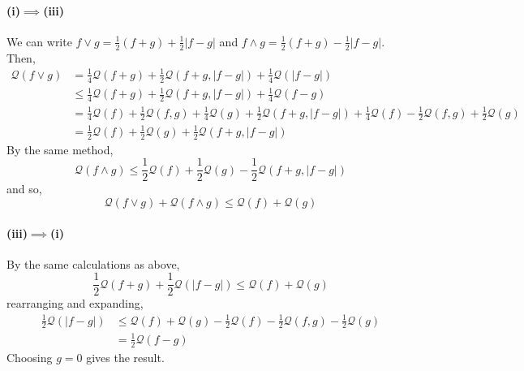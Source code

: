 \paragraph{(i)$\implies$(iii)}
We can write $f\vee g = \frac{1}{2}(f+g)+\frac{1}{2}|f-g|$ and $f\wedge g = \frac{1}{2}(f+g)-\frac{1}{2}|f-g|$. Then,
\begin{equation*}
	\begin{aligned}
		\mathcal{Q}(f\vee g) &= \frac{1}{4}\mathcal{Q}(f+g) + \frac{1}{2}\mathcal{Q}(f+g,|f-g|) + \frac{1}{4}\mathcal{Q}(|f-g|)\\
		&\leq \frac{1}{4}\mathcal{Q}(f+g) + \frac{1}{2}\mathcal{Q}(f+g,|f-g|) + \frac{1}{4}\mathcal{Q}(f-g)\\
		&= \frac{1}{4}\mathcal{Q}(f) + \frac{1}{2}\mathcal{Q}(f,g) + \frac{1}{4}\mathcal{Q}(g) + \frac{1}{2}\mathcal{Q}(f+g,|f-g|) + \frac{1}{4}\mathcal{Q}(f) - \frac{1}{2}\mathcal{Q}(f,g) + \frac{1}{2}\mathcal{Q}(g)\\
		&= \frac{1}{2}\mathcal{Q}(f) + \frac{1}{2}\mathcal{Q}(g) + \frac{1}{2}\mathcal{Q}(f+g,|f-g|)
	\end{aligned}
\end{equation*}
By the same method,
\begin{equation*}
	\mathcal{Q}(f\wedge g) \leq \frac{1}{2}\mathcal{Q}(f) + \frac{1}{2}\mathcal{Q}(g) - \frac{1}{2}\mathcal{Q}(f+g,|f-g|)
\end{equation*}
and so,
\begin{equation*}
	\mathcal{Q}(f\vee g) + \mathcal{Q}(f\wedge g) \leq \mathcal{Q}(f) + \mathcal{Q}(g)
\end{equation*}

\paragraph{(iii)$\implies$(i)}
By the same calculations as above,
\begin{equation*}
	\frac{1}{2}\mathcal{Q}(f+g) + \frac{1}{2}\mathcal{Q}(|f-g|) \leq \mathcal{Q}(f) + \mathcal{Q}(g)
\end{equation*}
rearranging and expanding,
\begin{equation*}
	\begin{aligned}
		\frac{1}{2}\mathcal{Q}(|f-g|) &\leq \mathcal{Q}(f) + \mathcal{Q}(g) - \frac{1}{2}\mathcal{Q}(f) - \frac{1}{2}\mathcal{Q}(f,g) - \frac{1}{2}\mathcal{Q}(g)\\
		&= \frac{1}{2}\mathcal{Q}(f-g)
	\end{aligned}
\end{equation*}
Choosing $g=0$ gives the result.

